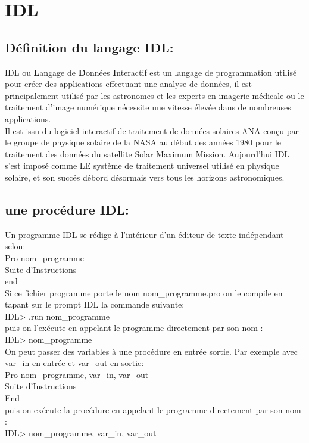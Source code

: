\section{IDL}

   \subsection{Définition du langage IDL:}

   IDL ou \textbf{L}angage de \textbf{D}onnées \textbf{I}nteractif est un langage de programmation utilisé pour créer des applications effectuant une analyse de données, il est principalement utilisé par les astronomes et les experts en imagerie médicale ou le traitement d'image numérique nécessite une vitesse élevée dans de nombreuses applications.\\
   Il est issu du logiciel interactif de traitement de données solaires ANA conçu par le groupe de physique solaire de la NASA au début des années 1980 pour le traitement des données du satellite Solar Maximum Mission. Aujourd'hui IDL s'est imposé comme LE système de traitement universel utilisé en physique solaire, et son succés débord désormais vers tous les horizons astronomiques.

   \subsection{une procédure IDL:}
   Un programme IDL se rédige à l’intérieur d'un éditeur de texte indépendant selon:\\
   Pro nom\_programme\\
      Suite d’Instructions\\
   end\\
   Si ce fichier programme porte le nom nom\_programme.pro on le compile en tapant sur
   le prompt IDL la commande suivante:\\
   IDL> .run nom\_programme\\
   puis on l’exécute en appelant le programme directement par son nom :\\
   IDL> nom\_programme\\
   On peut passer des variables à une procédure en entrée sortie. Par exemple avec var\_in
   en entrée et var\_out en sortie:\\
   Pro nom\_programme, var\_in, var\_out\\
   Suite d’Instructions\\
   End\\
   puis on exécute la procédure en appelant le programme directement par son nom :\\
   IDL> nom\_programme, var\_in, var\_out


